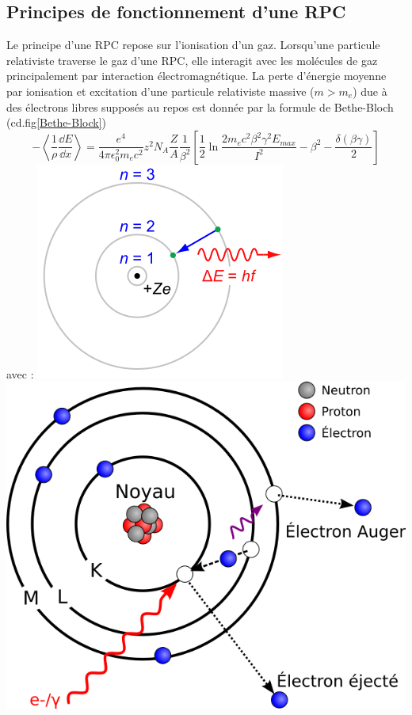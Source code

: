 \subsection{Principes de fonctionnement d'une RPC}
Le principe d'une RPC repose sur l'ionisation d'un gaz. Lorsqu'une particule relativiste traverse le gaz d'une RPC, elle interagit avec les molécules de gaz principalement par interaction électromagnétique. La perte d'énergie moyenne par ionisation et excitation d'une particule relativiste massive ($m>m_{e}$) due à des électrons libres supposés au repos est donnée par la formule de Bethe-Bloch (cd.fig\ref{Bethe-Block})
\begin{equation}
-\left<\frac{1}{\rho}\frac{\dd E}{\dd x}\right>=\frac{e^{4}}{4\pi \epsilon_{0}^{2}m_{e}c^{2}}z^{2}N_{A}\frac{Z}{A}\frac{1}{\beta^{2}}\left[\frac{1}{2}\ln\frac{2m_{e}c^{2}\beta^{2}\gamma^{2}E_{max}}{I^{2}}-\beta^{2}-\frac{\delta(\beta\gamma)}{2}\right]
\end{equation}
avec :
	\marginpar
{
	\centering
	\includegraphics[width=\marginparwidth]{RPC/Photon.png}
	\label{photon}
}
\marginpar
{
	\centering
	\includegraphics[width=\marginparwidth]{RPC/Auger.png}
	\label{Auger}
}
